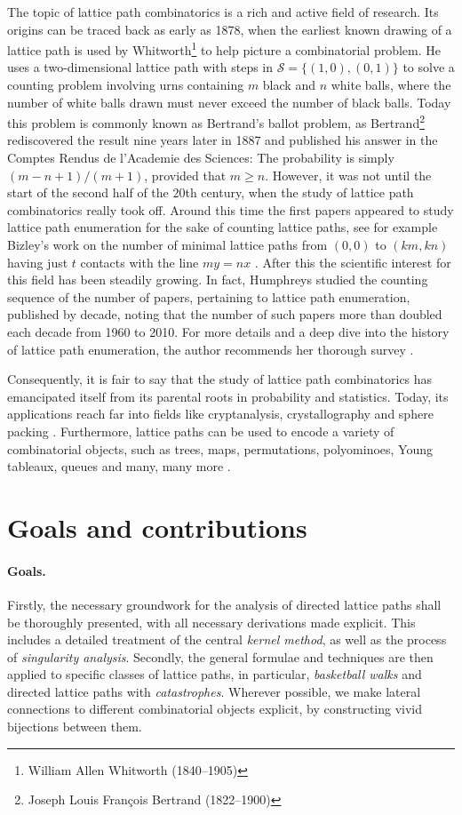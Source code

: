 The topic of lattice path combinatorics is a rich and active field of research. 
Its origins can be traced back as early as 1878, when the earliest known drawing of a lattice path is used by Whitworth\footnote{William Allen Whitworth (1840--1905)} \cite{FirstLatticePath} to help picture a combinatorial problem. 
He uses a two-dimensional lattice path with steps in $\mathcal{S} = \{(1,0), (0,1)\}$ to solve a counting problem involving urns containing $m$ black and $n$ white balls, where the number of white balls drawn must never exceed the number of black balls. 
Today this problem is commonly known as Bertrand's ballot problem, as Bertrand\footnote{Joseph Louis François Bertrand (1822--1900)} rediscovered the result nine years later in 1887 and published his answer in the Comptes Rendus de l'Academie des Sciences: 
The probability is simply $(m - n + 1)/(m + 1)$, provided that $m \geq n$. 
However, it was not until the start of the second half of the 20th century, when the study of lattice path combinatorics really took off.
Around this time the first papers appeared to study lattice path enumeration for the sake of counting lattice paths, see for example Bizley's work on the number of minimal lattice paths from $(0,0)$ to $(km,kn)$ having just $t$ contacts with the line $my = nx$ \cite{Bizley}. 
After this the scientific interest for this field has been steadily growing. 
In fact, Humphreys studied the counting sequence of the number of papers, pertaining to lattice path enumeration, published by decade, noting that the number of such papers more than doubled each decade from 1960 to 2010. 
For more details and a deep dive into the history of lattice path enumeration, the author recommends her thorough survey \cite{HistoryLatticePathEnumeration}.

Consequently, it is fair to say that the study of lattice path combinatorics has emancipated itself from its parental roots in probability and statistics. Today, its applications reach far into fields like cryptanalysis, crystallography and sphere packing \cite{Invitation}. Furthermore, lattice paths can be used to encode a variety of combinatorial objects, such as trees, maps, permutations, polyominoes, Young tableaux, queues and many, many more \cite{SmallSteps}.

\section*{Goals and contributions}

\paragraph*{Goals.}
Firstly, the necessary groundwork for the analysis of directed lattice paths shall be thoroughly presented, with all necessary derivations made explicit. This includes a detailed treatment of the central \textit{kernel method}, as well as the process of \textit{singularity analysis}.
Secondly, the general formulae and techniques are then applied to specific classes of lattice paths, in particular, \textit{basketball walks} and directed lattice paths with \textit{catastrophes}. Wherever possible, we make lateral connections to different combinatorial objects explicit, by constructing vivid bijections between them.
